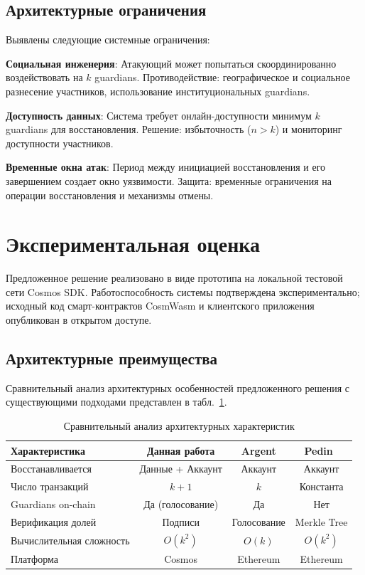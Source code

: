 \documentclass[12pt]{a&t}
\begin{document}
\subsection{Архитектурные ограничения}

Выявлены следующие системные ограничения:

\begin{itemlist}
\item
\textbf{Социальная инженерия}: Атакующий может попытаться скоординированно воздействовать на $k$ guardians. Противодействие: географическое и социальное разнесение участников, использование институциональных guardians.

\item
\textbf{Доступность данных}: Система требует онлайн-доступности минимум $k$ guardians для восстановления. Решение: избыточность ($n > k$) и мониторинг доступности участников.

\item
\textbf{Временные окна атак}: Период между инициацией восстановления и его завершением создает окно уязвимости. Защита: временные ограничения на операции восстановления и механизмы отмены.
\end{itemlist}

\section{Экспериментальная оценка}

Предложенное решение реализовано в виде прототипа на локальной тестовой сети Cosmos SDK. Работоспособность системы подтверждена экспериментально; исходный код смарт-контрактов CosmWasm и клиентского приложения опубликован в открытом доступе.

\subsection{Архитектурные преимущества}

Сравнительный анализ архитектурных особенностей предложенного решения с существующими подходами представлен в табл.~\ref{tab:performance}.

\begin{table}[H]
\centering
\caption{Сравнительный анализ архитектурных характеристик}
\label{tab:performance}
\begin{tabular}{|l|c|c|c|}
\hline
\textbf{Характеристика} & \textbf{Данная работа} & \textbf{Argent} & \textbf{Pedin~\cite{pedin2023}} \\
\hline
Восстанавливается & Данные + Аккаунт & Аккаунт & Аккаунт \\
\hline
Число транзакций & $k+1$ & $k$ & Константа \\
\hline
Guardians on-chain & Да (голосование) & Да & Нет \\
\hline
Верификация долей & Подписи & Голосование & Merkle Tree \\
\hline
Вычислительная сложность & $O(k^2)$ & $O(k)$ & $O(k^2)$ \\
\hline
Платформа & Cosmos & Ethereum & Ethereum \\
\hline
\end{tabular}
\end{table}
\end{document}
